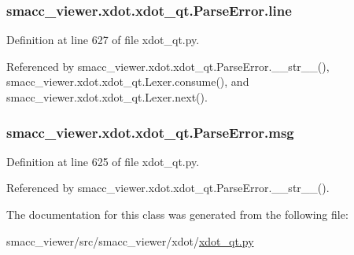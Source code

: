 \subsubsection[{\texorpdfstring{line}{line}}]{\setlength{\rightskip}{0pt plus 5cm}smacc\+\_\+viewer.\+xdot.\+xdot\+\_\+qt.\+Parse\+Error.\+line}\hypertarget{classsmacc__viewer_1_1xdot_1_1xdot__qt_1_1ParseError_a7ffc812fac9ed30e9db6b5e1fdfd60b9}{}\label{classsmacc__viewer_1_1xdot_1_1xdot__qt_1_1ParseError_a7ffc812fac9ed30e9db6b5e1fdfd60b9}


Definition at line 627 of file xdot\+\_\+qt.\+py.



Referenced by smacc\+\_\+viewer.\+xdot.\+xdot\+\_\+qt.\+Parse\+Error.\+\_\+\+\_\+str\+\_\+\+\_\+(), smacc\+\_\+viewer.\+xdot.\+xdot\+\_\+qt.\+Lexer.\+consume(), and smacc\+\_\+viewer.\+xdot.\+xdot\+\_\+qt.\+Lexer.\+next().

\subsubsection[{\texorpdfstring{msg}{msg}}]{\setlength{\rightskip}{0pt plus 5cm}smacc\+\_\+viewer.\+xdot.\+xdot\+\_\+qt.\+Parse\+Error.\+msg}\hypertarget{classsmacc__viewer_1_1xdot_1_1xdot__qt_1_1ParseError_ad7085eae371cd4b0996ebbe3fb941290}{}\label{classsmacc__viewer_1_1xdot_1_1xdot__qt_1_1ParseError_ad7085eae371cd4b0996ebbe3fb941290}


Definition at line 625 of file xdot\+\_\+qt.\+py.



Referenced by smacc\+\_\+viewer.\+xdot.\+xdot\+\_\+qt.\+Parse\+Error.\+\_\+\+\_\+str\+\_\+\+\_\+().



The documentation for this class was generated from the following file\+:\begin{DoxyCompactItemize}
\item 
smacc\+\_\+viewer/src/smacc\+\_\+viewer/xdot/\hyperlink{xdot__qt_8py}{xdot\+\_\+qt.\+py}\end{DoxyCompactItemize}
